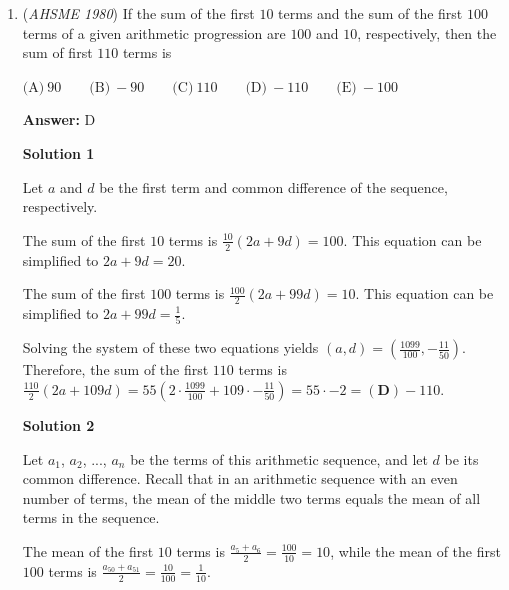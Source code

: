 \begin{enumerate}
 \textbf{Answer: }D



\textbf{Solution}

Since the gears are meshed, they must all rotate the same number of teeth per minute.  Let $k$ be this rate. Then gears $A$, $B$, and $C$ must have angular speeds of $\frac{k}{x}$, $\frac{k}{y}$, and $\frac{k}{z}$, respectively.  Thus the ratio of the three gears' angular speeds is $\frac{k}{x}:\frac{k}{y}:\frac{k}{z}$.  Multiplying each term of this ratio by $\frac{xyz}{k}$ yields $\boxed{(\textbf{D})\ yz:xz:xy}$.

 


	\item (\textit{AHSME 1980}) If the sum of the first $10$ terms and the sum of the first $100$ terms of a given arithmetic progression are $100$ and $10$, 
respectively, then the sum of first $110$ terms is


 $\text{(A)} \ 90 \qquad \text{(B)} \ -90 \qquad \text{(C)} \ 110 \qquad \text{(D)} \ -110 \qquad \text{(E)} \ -100$

 \textbf{Answer: }D



\textbf{Solution 1}

Let $a$ and $d$ be the first term and common difference of the sequence, respectively.

 The sum of the first $10$ terms is $\frac{10}{2}(2a+9d)=100$. This equation can be simplified to $2a+9d=20$.

 The sum of the first $100$ terms is $\frac{100}{2}(2a+99d)=10$. This equation can be simplified to $2a+99d=\frac{1}{5}$.

 Solving the system of these two equations yields $(a, d) = \left(\frac{1099}{100}, -\frac{11}{50}\right)$.  Therefore, the sum of the first $110$ terms is $\frac{110}{2}(2a+109d)=55\left(2\cdot\frac{1099}{100} + 109 \cdot -\frac{11}{50}\right) = 55 \cdot -2 = \boxed{(\textbf{D}) -110}$.

 



\textbf{Solution 2}

Let $a_1$, $a_2$, ..., $a_n$ be the terms of this arithmetic sequence, and let $d$ be its common difference.  Recall that in an arithmetic sequence with an even number of terms, the mean of the middle two terms equals the mean of all terms in the sequence.  

 The mean of the first $10$ terms is $\frac{a_5 + a_6}{2} = \frac{100}{10} = 10$, while the mean of the first $100$ terms is $\frac{a_{50}+a_{51}}{2} = \frac{10}{100} = \frac{1}{10}$.  


\end{enumerate}
